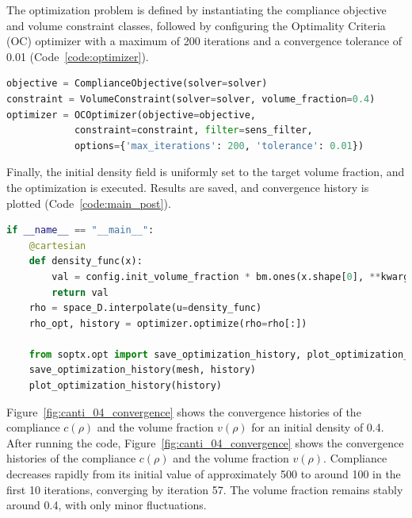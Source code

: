 \documentclass[mathpazo]{cicp}
\begin{document}
The optimization problem is defined by instantiating the compliance objective and volume constraint classes, followed by configuring the Optimality Criteria (OC) optimizer with a maximum of 200 iterations and a convergence tolerance of 0.01 (Code~\ref{code:optimizer}).

\vspace{-0.5ex} %
\begin{lstlisting}[language=python, caption={Optimization module}, label={code:optimizer}]
objective = ComplianceObjective(solver=solver)
constraint = VolumeConstraint(solver=solver, volume_fraction=0.4)
optimizer = OCOptimizer(objective=objective,
			constraint=constraint, filter=sens_filter,
			options={'max_iterations': 200, 'tolerance': 0.01})
\end{lstlisting}
\vspace{-0.5ex} %

Finally, the initial density field is uniformly set to the target volume fraction, and the optimization is executed. Results are saved, and convergence history is plotted (Code~\ref{code:main_post}).

\vspace{-0.5ex} %
\begin{lstlisting}[language=python, caption={Main program and post-processing}, label={code:main_post}]
if __name__ == "__main__":
	@cartesian
	def density_func(x):
		val = config.init_volume_fraction * bm.ones(x.shape[0], **kwargs)
		return val
	rho = space_D.interpolate(u=density_func)
	rho_opt, history = optimizer.optimize(rho=rho[:])
	
	from soptx.opt import save_optimization_history, plot_optimization_history
	save_optimization_history(mesh, history)
	plot_optimization_history(history)
\end{lstlisting}
\vspace{-0.5ex} %

Figure~\ref{fig:canti_04_convergence} shows the convergence histories of the compliance $c(\rho)$ and the volume fraction $v(\rho)$ for an initial density of 0.4. After running the code, Figure~\ref{fig:canti_04_convergence} shows the convergence histories of the compliance $c(\rho)$ and the volume fraction $v(\rho)$. Compliance decreases rapidly from its initial value of approximately 500 to around 100 in the first 10 iterations, converging by iteration 57. The volume fraction remains stably around 0.4, with only minor fluctuations.
\end{document}
